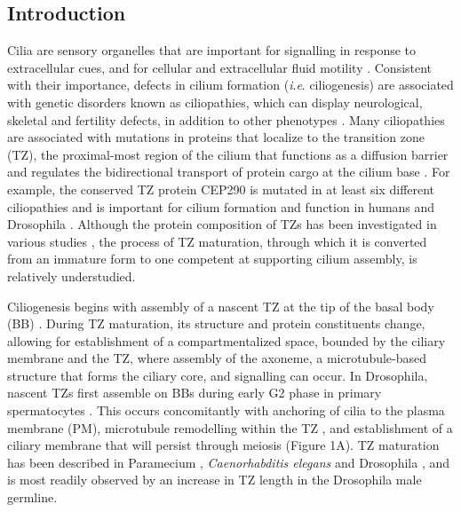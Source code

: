 \documentclass[12pt, twoside, letterpaper]{article}
\newcommand{\ie}{\textit{i}.\textit{e}.}
\begin{document}
\begin{doublespacing}
\begin{linenumbers}
    \section*{Introduction}
    Cilia are sensory organelles that are important for
    signalling in response to extracellular cues,
    and for cellular and extracellular fluid motility
    \citep{satir2010primary, marshall2006cilia, eley2005cilia, brooks2014multiciliated}.
    Consistent with their importance,
    defects in cilium formation (\ie{} ciliogenesis) are associated with genetic disorders
    known as ciliopathies, which can display
    neurological, skeletal and fertility defects, in addition to other phenotypes
    \citep{waters2011ciliopathies, valente2014primary, hammarsjo2017novel, inaba2016sperm}.
    Many ciliopathies are associated with mutations in proteins that localize
    to the transition zone (TZ), the proximal-most region of the cilium that
    functions as a diffusion barrier and regulates the
    bidirectional transport of protein cargo at the cilium base
    \citep{reiter2012base, szymanska2012transition}.
    For example, the conserved TZ protein CEP290 is mutated in at least
    six different ciliopathies
    \citep{rachel2012photoreceptor}
    and is important for cilium formation
    and function in humans \citep{shimada2017vitro, stowe2012centriolar}
    and Drosophila \citep{basiri2014migrating}.
    Although the protein composition of TZs has been investigated in various
    studies \citep{gonccalves2017ciliary},
    the process of TZ maturation, through which it is converted from an
    immature form to one competent at supporting
    cilium assembly, is relatively understudied.

    Ciliogenesis begins with assembly of a nascent TZ at the tip of
    the basal body (BB) \citep{reiter2012base}.
    During TZ maturation, its structure and protein
    constituents change, allowing for
    establishment of a compartmentalized space, bounded by the ciliary membrane
    and the TZ, where assembly of the axoneme, a microtubule-based structure
    that forms the ciliary core,
    and signalling can occur.
    In Drosophila, nascent TZs first assemble on BBs
    during early G2 phase in primary spermatocytes \citep{riparbelli2012assembly}.
    This occurs concomitantly with anchoring of cilia to the plasma membrane (PM),
    microtubule remodelling within the TZ \citep{riparbelli2013unique, gottardo2013cilium},
    and establishment of a
    ciliary membrane that will persist through meiosis
    \citep{riparbelli2012assembly} (Figure 1A).
    TZ maturation has been described in
    Paramecium \citep{aubusson2015transition},
    \textit{Caenorhabditis elegans} \citep{serwas2017centrioles} and
    Drosophila \citep{gottardo2013cilium},
    and is most readily observed by an increase in TZ length
    in the Drosophila male germline.


\end{linenumbers}
\end{doublespacing}
\end{document}
